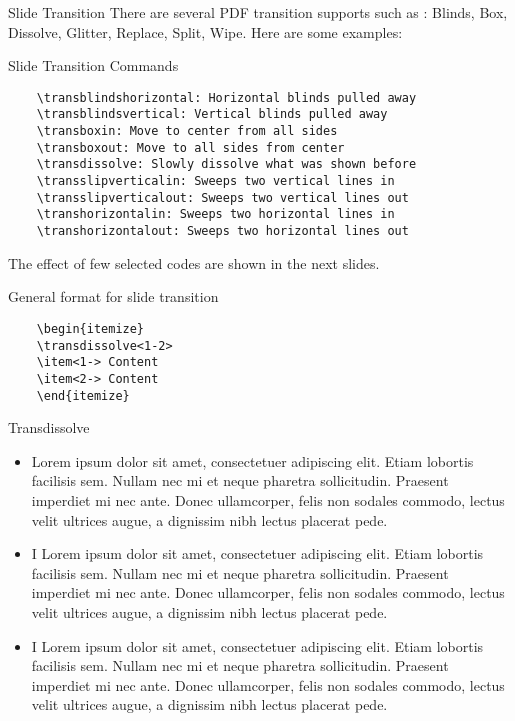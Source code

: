 \documentclass[10pt,xcolor=x11names]{beamer}
\begin{document}
\begin{frame}[fragile,shrink=12]{Slide Transition} \vspace{-3pt}
There are several PDF transition supports such as : Blinds, Box, Dissolve, Glitter, Replace,
Split, Wipe.
 Here are some examples:
\begin{exampleblock}{Slide Transition Commands}
	\begin{verbatim}
	\transblindshorizontal: Horizontal blinds pulled away
	\transblindsvertical: Vertical blinds pulled away
	\transboxin: Move to center from all sides
	\transboxout: Move to all sides from center
	\transdissolve: Slowly dissolve what was shown before
	\transslipverticalin: Sweeps two vertical lines in
	\transslipverticalout: Sweeps two vertical lines out
	\transhorizontalin: Sweeps two horizontal lines in
	\transhorizontalout: Sweeps two horizontal lines out
	\end{verbatim}
\end{exampleblock}

The effect of few selected codes are shown in the next slides.
 
\begin{exampleblock}{General format for slide transition}
	\begin{verbatim}
	\begin{itemize}
	\transdissolve<1-2> 
	\item<1-> Content 
	\item<2-> Content 
	\end{itemize}
	\end{verbatim}
\end{exampleblock}
\end{frame}

\begin{frame}[c]{Transdissolve} \vspace{0pt}

\begin{itemize}
\item<1-> Lorem ipsum dolor sit amet, consectetuer adipiscing elit. Etiam lobortis facilisis sem. Nullam nec mi et neque pharetra sollicitudin. Praesent imperdiet mi nec ante. Donec ullamcorper, felis non sodales commodo, lectus velit ultrices augue, a dignissim nibh lectus placerat pede.
\item<2-> I Lorem ipsum dolor sit amet, consectetuer adipiscing elit. Etiam lobortis
facilisis sem. Nullam nec mi et neque pharetra sollicitudin. Praesent
imperdiet mi nec ante. Donec ullamcorper, felis non sodales commodo, lectus
velit ultrices augue, a dignissim nibh lectus placerat pede.
\item<3-> I Lorem ipsum dolor sit amet, consectetuer adipiscing elit. Etiam lobortis
facilisis sem. Nullam nec mi et neque pharetra sollicitudin. Praesent
imperdiet mi nec ante. Donec ullamcorper, felis non sodales commodo, lectus
velit ultrices augue, a dignissim nibh lectus placerat pede.
\end{itemize}

\end{frame}
\end{document}
